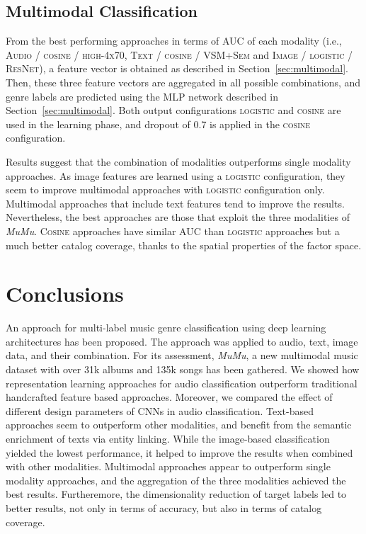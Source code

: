 \documentclass{article}
\begin{document}
\subsection{Multimodal Classification}\label{sec:multiexp}

From the best performing approaches in terms of AUC of each modality (i.e., \textsc{Audio} / \textsc{cosine} / \textsc{high-4x70}, \textsc{Text} / \textsc{cosine} / \textsc{VSM+Sem} and \textsc{Image} / \textsc{logistic} / \textsc{ResNet}), a feature vector is obtained as described in Section~\ref{sec:multimodal}. 
Then, these three feature vectors are aggregated in all possible combinations, and genre labels are predicted using the MLP network described in Section~\ref{sec:multimodal}.
Both output configurations \textsc{logistic} and \textsc{cosine} are used in the learning phase, and dropout of 0.7 is applied in the \textsc{cosine} configuration.


Results suggest that the combination of modalities outperforms single modality approaches. 
As image features are learned using a \textsc{logistic} configuration, they seem to improve multimodal approaches with \textsc{logistic} configuration only. 
Multimodal approaches that include text features tend to improve the results. Nevertheless, the best approaches are those that exploit the three modalities of \emph{MuMu}. \textsc{Cosine} approaches have similar AUC than \textsc{logistic} approaches but a much better catalog coverage, thanks to the spatial properties of the factor space. 



\section{Conclusions}\label{sec:conclusions}

An approach for multi-label music genre classification using deep learning architectures has been proposed. 
The approach was applied to audio, text, image data, and their combination. 
For its assessment, \emph{MuMu}, a new multimodal music dataset with over 31k albums and 135k songs has been gathered. 
We showed how representation learning approaches for audio classification outperform traditional handcrafted feature based approaches.
Moreover, we compared the effect of different design parameters of CNNs in audio classification. 
Text-based approaches seem to outperform other modalities, and benefit from the semantic enrichment of texts via entity linking. While the image-based classification yielded the lowest performance, it helped to improve the results when combined with other modalities.
Multimodal approaches appear to outperform single modality approaches, and the aggregation of the three modalities achieved the best results.
Furtheremore, the dimensionality reduction of target labels led to better results, not only in terms of accuracy, but also in terms of catalog coverage.
\end{document}
